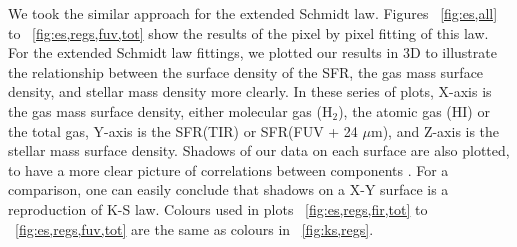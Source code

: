 \documentclass[useAMS,usenatbib]{mn2e}
\begin{document}
We took the similar approach for the extended Schmidt law. Figures ~\ref{fig:es,all} to ~\ref{fig:es,regs,fuv,tot} show the results of the pixel by pixel fitting of this law. For the extended Schmidt law fittings, we plotted our results in 3D to illustrate the relationship between the surface density of the SFR, the gas mass surface density, and stellar mass density more clearly. In these series of plots, X-axis is the gas mass  surface density, either molecular gas (H$_2$), the atomic gas (HI) or the total gas, Y-axis is the SFR(TIR) or SFR(FUV + 24 $\mu$m), and Z-axis is the stellar mass surface density. Shadows of our data on each surface are also plotted, to have a more clear picture of correlations between components . For a comparison, one can easily conclude that shadows on a X-Y surface is a reproduction of K-S law. Colours used in plots ~\ref{fig:es,regs,fir,tot} to ~\ref{fig:es,regs,fuv,tot} are the same as colours in  ~\ref{fig:ks,regs}.

\end{document}
